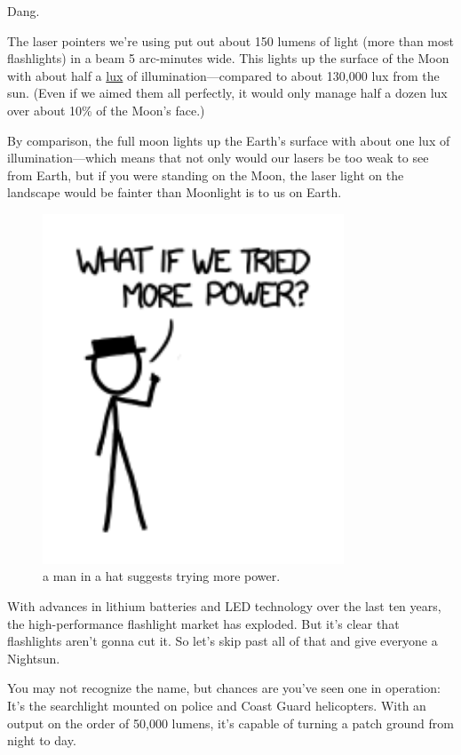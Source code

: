 {Dang.}

{The laser pointers we’re using put out about 150 lumens of light (more than most flashlights) in a beam 5 arc-minutes wide. This lights up the surface of the Moon with about half a \href{http://en.wikipedia.org/wiki/Lux}{lux} of illumination—compared to about 130,000 lux from the sun. (Even if we aimed them all perfectly, it would only manage half a dozen lux over about 10\% of the Moon’s face.)}

{By comparison, the full moon lights up the Earth’s surface with about one lux of illumination—which means that not only would our lasers be too weak to see from Earth, but if you were standing on the Moon, the laser light on the landscape would be fainter than Moonlight is to us on Earth.}

\begin{figure}[!htbp]
\centering
\includegraphics[scale=0.5, max width=0.8\textwidth]{imgs/a/13/laser_pointer_more_power.png}
\caption{a man in a hat suggests trying more power.}
\end{figure}

{With advances in lithium batteries and LED technology over the last ten years, the high-performance flashlight market has exploded. But it’s clear that flashlights aren’t gonna cut it. So let’s skip past all of that and give everyone a Nightsun.}

{You may not recognize the name, but chances are you’ve seen one in operation: It’s the searchlight mounted on police and Coast Guard helicopters. With an output on the order of 50,000 lumens, it’s capable of turning a patch ground from night to day.}

